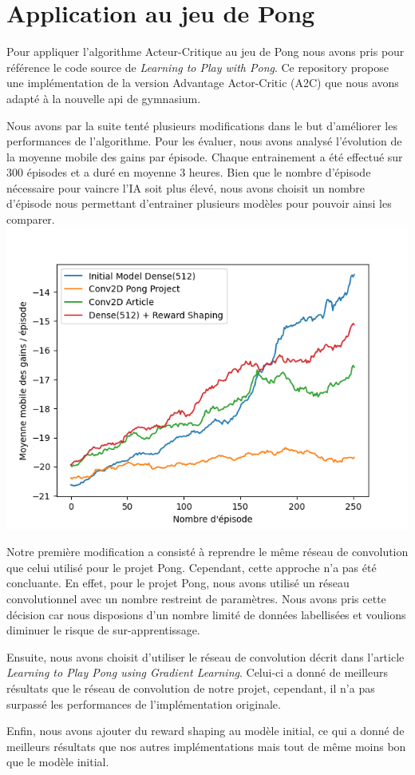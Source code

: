 \section{Application au jeu de Pong}

Pour appliquer l'algorithme Acteur-Critique au jeu de Pong nous avons pris pour référence le code source
de \emph{Learning to Play with Pong}\cite{PongGithub}. Ce repository propose une implémentation de la version Advantage Actor-Critic (A2C)
que nous avons adapté à la nouvelle api de gymnasium.

Nous avons par la suite tenté plusieurs modifications dans le but d'améliorer les performances de l'algorithme.
Pour les évaluer, nous avons analysé l'évolution de la moyenne mobile des gains par épisode.
Chaque entrainement a été effectué sur 300 épisodes et a duré en moyenne 3 heures. Bien que le nombre d'épisode nécessaire
pour vaincre l'IA soit plus élevé, nous avons choisit un nombre d'épisode nous permettant d'entrainer plusieurs modèles pour pouvoir ainsi les comparer.
\includegraphics[width=\linewidth]{rolling_average_graph.png}

\par Notre première modification a consisté à reprendre le même réseau de convolution que celui utilisé pour le projet Pong. 
Cependant, cette approche n'a pas été concluante. 
En effet, pour le projet Pong, nous avons utilisé un réseau convolutionnel avec un nombre restreint de 
paramètres. Nous avons pris cette décision car nous disposions d'un nombre limité de données labellisées 
et voulions diminuer le risque de sur-apprentissage. 

\par Ensuite, nous avons choisit d'utiliser le réseau de convolution 
décrit dans l'article \emph{Learning to Play Pong using Gradient Learning}\cite{PongPolicyGradient}.
Celui-ci a donné de meilleurs résultats que le réseau de convolution de notre projet, cependant, il n'a pas surpassé 
les performances de l'implémentation originale.

\par Enfin, nous avons ajouter du reward shaping au modèle initial, ce qui a donné de meilleurs résultats que nos autres 
implémentations mais tout de même moins bon que le modèle initial.

